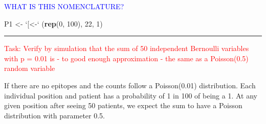 \documentclass[]{article}
\newenvironment{Shaded}{\begin{snugshade}}{\end{snugshade}}
\newcommand{\KeywordTok}[1]{\textcolor[rgb]{0.13,0.29,0.53}{\textbf{#1}}}
\newcommand{\DataTypeTok}[1]{\textcolor[rgb]{0.13,0.29,0.53}{#1}}
\newcommand{\DecValTok}[1]{\textcolor[rgb]{0.00,0.00,0.81}{#1}}
\newcommand{\StringTok}[1]{\textcolor[rgb]{0.31,0.60,0.02}{#1}}
\newcommand{\NormalTok}[1]{#1}
\let\oldrule=\rule
\renewcommand{\rule}[1]{\oldrule{\linewidth}}
\begin{document}
\textcolor{blue}{WHAT IS THIS NOMENCLATURE?}

\begin{Shaded}
\begin{Highlighting}[]
\NormalTok{P1 <-}\StringTok{ `}\DataTypeTok{[<-}\StringTok{`}\NormalTok{ (}\KeywordTok{rep}\NormalTok{(}\DecValTok{0}\NormalTok{, }\DecValTok{100}\NormalTok{), }\DecValTok{22}\NormalTok{, }\DecValTok{1}\NormalTok{)}
\end{Highlighting}
\end{Shaded}

\begin{center}\rule{0.5\linewidth}{\linethickness}\end{center}

\textcolor{red}{Task: Verify by simulation that the sum of 50 independent Bernoulli variables with p = 0.01 is - to good enough approximation - the same as a Poisson(0.5) random variable}

If there are no epitopes and the counts follow a Poisson(0.01)
distribution. Each individual position and patient has a probability of
1 in 100 of being a 1. At any given position after seeing 50 patients,
we expect the sum to have a Poisson distribution with parameter 0.5.
\end{document}

